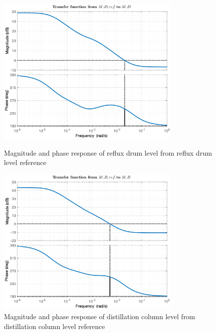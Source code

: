 \documentclass[12pt]{article}
\begin{document}
\begin{figure}[p]
\centering
\includegraphics[width=0.8\textwidth]{../Systemanalyse/Log_Data_to_Matlab/Figurer/Identifisering/MD_bode.eps}
\caption{Magnitude and phase response of reflux drum level from reflux drum level reference}
\label{fig:L11}

\includegraphics[width=0.8\textwidth]{../Systemanalyse/Log_Data_to_Matlab/Figurer/Identifisering/MB_bode.eps}
\caption{Magnitude and phase response of distillation column level from distillation column level reference}
\label{fig:L22}
\end{figure}

\end{document}
